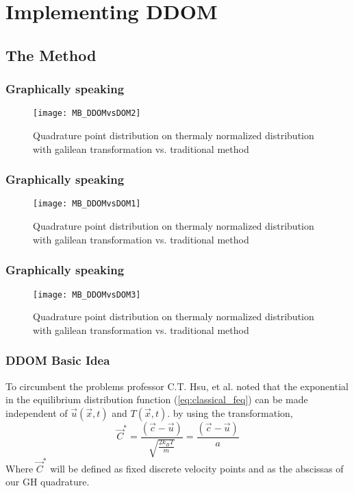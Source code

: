 \section{Implementing DDOM}
\subsection{The Method}

\begin{frame}
	\frametitle{Graphically speaking}
	
		\begin{figure}
			\centering
				\texttt{[image: MB\_DDOMvsDOM2]}
			\caption{Quadrature point distribution on thermaly normalized distribution with galilean transformation vs. traditional method}
			\label{fig:MB_DDOMvsDOM2}
		\end{figure}
	
\end{frame}

\begin{frame}
	\frametitle{Graphically speaking}
		
		\begin{figure}
			\centering
				\texttt{[image: MB\_DDOMvsDOM1]}
			\caption{Quadrature point distribution on thermaly normalized distribution with galilean transformation vs. traditional method}
			\label{fig:MB_DDOMvsDOM1}
		\end{figure}
		
\end{frame}

\begin{frame}
	\frametitle{Graphically speaking}

		\begin{figure}
			\centering
				\texttt{[image: MB\_DDOMvsDOM3]}
			\caption{Quadrature point distribution on thermaly normalized distribution with galilean transformation vs. traditional method}
			\label{fig:MB_DDOMvsDOM3}
		\end{figure}
		
\end{frame}

\begin{frame}
	\frametitle{DDOM Basic Idea}
	To circumbent the problems professor C.T. Hsu, et al. \cite{ISI:000303761300021,Hsu201239} noted that the exponential in the equilibrium distribution function (\ref{eq:classical_feq}) can be made independent of $\vec{u}(\vec{x},t)$ and $T(\vec{x},t)$. by using the transformation,
	\begin{equation}
	\vec{C}^{*}  = \frac{(\vec{c}-\vec{u})}{\sqrt{\frac{2 k_B T}{m}}} = \frac{(\vec{c}-\vec{u})}{a}
	\label{eq:transformation}
	\end{equation}
	Where $\vec{C}^{*}$ will be defined as fixed discrete velocity points and as the abscissas of our GH quadrature.
\end{frame}

